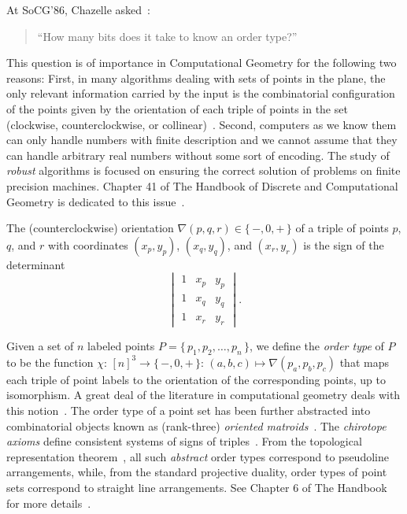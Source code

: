At SoCG'86, Chazelle asked~\cite{GP93}:
\begin{quotation}
``How many bits does it take to know an order type?''
\end{quotation}

This question is of importance in Computational Geometry for the following two
reasons:
%
First, in many algorithms dealing with sets of points in the plane,
the only relevant information carried by the input is the combinatorial
configuration of the points given by the orientation of each triple of points in the
set (clockwise, counterclockwise, or collinear)~\cite{Knu92,Ed12,Epp18}.
%
Second, computers as we know them can only handle numbers with
finite description and we cannot assume that they can handle arbitrary
real numbers without some sort of encoding. The study of \emph{robust}
algorithms is focused on ensuring the correct solution of problems on finite
precision machines. Chapter 41 of The Handbook of Discrete and Computational
Geometry is dedicated to this issue~\cite{Ya04}.

The (counterclockwise) orientation \(\nabla(p,q,r) \in \{\, -, 0, +\,\}\) of a triple of points
\(p\), \(q\), and \(r\) with coordinates \((x_p, y_p)\), \((x_q, y_q)\), and
\((x_r, y_r)\) is the sign of the determinant
\begin{displaymath}
    \begin{vmatrix}
	1 & x_p & y_p \\
	1 & x_q & y_q \\
	1 & x_r & y_r
    \end{vmatrix}.
\end{displaymath}

Given a set of \(n\) labeled points \(P = \{\, p_1, p_2, \ldots, p_n\,\}\), we
define the \emph{order type} of \(P\) to be the function \(\chi \colon\,
{[n]}^3 \to \{\, -, 0, +\,\} \colon\, (a,b,c) \mapsto \nabla(p_a, p_b, p_c)\)
that maps each triple of point labels to the orientation of the corresponding
points, up to isomorphism.
%
\ifeurocg\else%
A great deal of the literature in computational geometry deals with this
notion~\cite{%
AAK02a,
AAK02b,
ACKLV16,
AKPV14,
AK01,
AK05,
AKMPW15,
AMP13,
Al86,
AILOW14,
BLSWZ93,
BMS01,
BRS92,
Epp18,
EHN99,
Fe96,
FV11,
FL78,
Go80,
GP83,
GP84,
GP86,
GP91,
GP93,
GPS89,
HM94,
HMMS11,
Knu92,
Le26,
MMIB12,
NV98,
Ri89,
RZ04,
Ri56,
St97%
}.
\fi%
The order type of a point set has been further abstracted into combinatorial
objects known as (rank-three) \emph{oriented matroids}~\cite{FL78}. The
\emph{chirotope axioms} define consistent systems of signs of
triples~\cite{BLSWZ93}.
%
From the topological representation theorem~\cite{BMS01}, all such
\emph{abstract} order types correspond to pseudoline arrangements, while, from
the standard projective duality, order types of point sets correspond to
straight line arrangements. See Chapter 6 of The Handbook for more
details~\cite{RZ04}.

